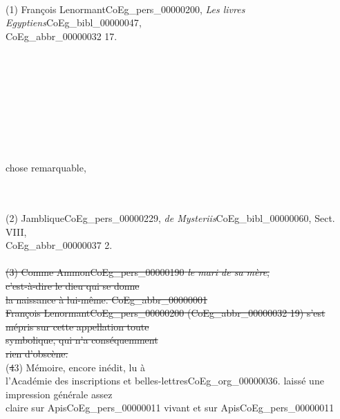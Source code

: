 \documentclass{book}
\begin{document}
{\begin{paracol}{2}
\noindent \\
\\
\\
\\
\\
\\
\\
\\
\\
\\
\\
\\
\\
(1) François Lenormant\gls{CoEg_pers_00000200}, \textit{Les livres Egyptiens}\gls{CoEg_bibl_00000047},\\
\gls{CoEg_abbr_00000032} 17.\\
\\
\\
\\
\\
\\
\\
\\
\\
\begin{flushright}chose remarquable,\end{flushright}
\noindent \\
\\
\noindent (2) Jamblique\gls{CoEg_pers_00000229}, \textit{de Mysteriis}\gls{CoEg_bibl_00000060}, Sect. VIII,\\
\gls{CoEg_abbr_00000037} 2.\\
\\
\sout{(3) Comme Ammon\gls{CoEg_pers_00000190} \textit{le mari de sa mère},\\
c’est-à-dire le dieu qui se donne\\
la naissance à lui-même. \gls{CoEg_abbr_00000001}\\
François Lenormant\gls{CoEg_pers_00000200} (\gls{CoEg_abbr_00000032} 19) s’est\\
mépris sur cette appellation toute\\
symbolique, qui n’a conséquemment\\
rien d’obscène.}\\
(\sout{4}3) Mémoire, encore inédit, lu à\\
l’Académie des inscriptions et belles-lettres\gls{CoEg_org_00000036}.
\switchcolumn
\noindent laissé une impression générale assez\\
claire sur Apis\gls{CoEg_pers_00000011} vivant et sur Apis\gls{CoEg_pers_00000011}\\

\end{paracol}}
\end{document}
